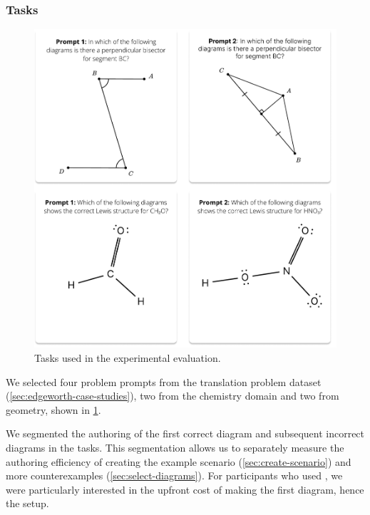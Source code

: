 \subsubsection{Tasks}
\label{sec:edgeworth-user-tasks}

\begin{figure}
    \centering
    \includegraphics[width=\linewidth]{assets/edgeworth-eval/user-study-tasks.pdf}
    \caption{Tasks used in the \Edgeworth experimental evaluation.}
    \label{fig:edgeworth-user-study-tasks}
\end{figure}

We selected four problem prompts from the translation problem dataset (\cref{sec:edgeworth-case-studies}), two from the chemistry domain and two from geometry, shown in \cref{fig:edgeworth-user-study-tasks}.

We segmented the authoring of the first correct diagram and subsequent incorrect diagrams in the tasks. This segmentation allows us to separately measure the authoring efficiency of creating the example scenario (\cref{sec:create-scenario}) and more counterexamples (\cref{sec:select-diagrams}). For participants who used \Edgeworth, we were particularly interested in the upfront cost of making the first \Substance diagram, hence the setup.


